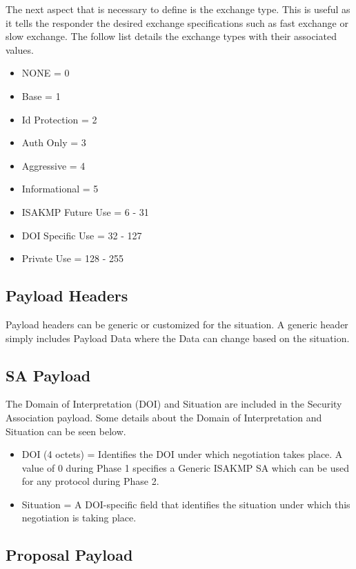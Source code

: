 \documentclass{article}
\begin{document}
The next aspect that is necessary to define is the exchange type. This is useful as it tells the responder the desired exchange specifications such as fast exchange or slow exchange. The follow list details the exchange types with their associated values. 

\begin{itemize}
\item NONE = 0
\item Base = 1
\item Id Protection = 2
\item Auth Only = 3
\item Aggressive = 4
\item Informational = 5
\item ISAKMP Future Use = 6 - 31
\item DOI Specific Use = 32 - 127
\item Private Use = 128 - 255
\end{itemize}

\subsection {Payload Headers}

Payload headers can be generic or customized for the situation. A generic header simply includes Payload Data where the Data can change based on the situation. 

\subsection {SA Payload}

The Domain of Interpretation (DOI) and Situation are included in the Security Association payload. Some details about the Domain of Interpretation and Situation can be seen below.

\begin{itemize}
\item DOI (4 octets) = Identifies the DOI under which negotiation takes place. A value of 0 during Phase 1 specifies a Generic ISAKMP SA which can be used for any protocol during Phase 2.
\item Situation = A DOI-specific field that identifies the situation under which this negotiation is taking place. 
\end{itemize}

\subsection {Proposal Payload}
\end{document}
